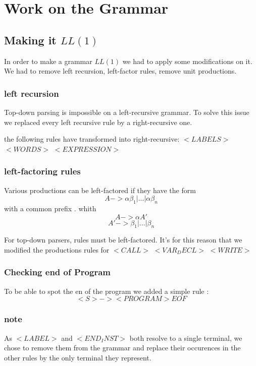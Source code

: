 
\section{Work on the Grammar}


\subsection{Making it $LL(1)$}
In order to make a grammar $LL(1)$ we had to apply some modifications on it. We had to remove left recursion, left-factor rules, remove unit productions.

\subsubsection{left recursion}

Top-down parsing is impossible on a left-recursive grammar. To solve this issue we replaced every left recursive rule by a right-recursive one.

the following rules have transformed into right-recursive: $<LABELS>$ $<WORDS>$ $<EXPRESSION>$

\subsubsection{left-factoring rules}
Various productions can be left-factored if they have the form
$$A -> \alpha \beta_{1} | ... | \alpha\beta_{n}$$
with a common prefix \alpha.
whith
$$A -> \alpha A'$$
$$A' -> \beta_{1} | ... | \beta_{n}$$

For top-down parsers, rules must be left-factored.
It's for this reason that we modified the productions rules for $<CALL>$ $<VAR_DECL>$ $<WRITE>$

\subsubsection{Checking end of Program}

To be able to spot the en of the program we added a simple rule :
$$<S> -> <PROGRAM> EOF$$

\subsubsection{note}

As $<LABEL>$ and $<END_INST>$ both resolve to a single terminal, we chose to remove them from the grammar and replace their occurences in the other rules by the only terminal they represent.

